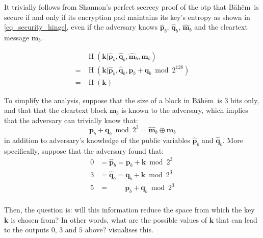\documentclass[twocolumn,hidelinks]{article}
\newcommand{\baheem}{Băhēm}
\DeclareMathOperator{\entropy}{H}
\begin{document}
It trivially follows from Shannon's perfect secrecy proof of the \gls{otp}
\cite{perfect_secrecy} that \baheem\ is secure if and only if its
encryption pad maintains its key's entropy as shown in
\cref{eq_security_hinge}, even if the adversary knows $\mathbf{\hat p}_b$,
$\mathbf{\hat q}_b$, $\mathbf{\hat m}_b$ and the cleartext message
$\mathbf{m}_b$.

\begin{equation}
    \begin{split}
        &\entropy(
            \mathbf{k}
            | \mathbf{\hat p}_b,
              \mathbf{\hat q}_b,
              \mathbf{\hat m}_b,
              \mathbf{m}_b
        ) \\
        =&\entropy(
            \mathbf{k}
            | \mathbf{\hat p}_b,
              \mathbf{\hat q}_b,
              \mathbf{p}_b + \mathbf{q}_b \bmod{2^{128}}
        ) \\
        =&\entropy(\mathbf{k})
    \end{split}
    \label{eq_security_hinge}
\end{equation}

To simplify the analysis, suppose that the size of a block in \baheem\ is
$3$ bits only, and that that the cleartext block $\mathbf{m}_b$ is known to
the adversary, which implies that the adversary can trivially know that:
\[
    \mathbf{p}_b + \mathbf{q}_b \bmod{2^3}
    = \mathbf{\hat m}_b \oplus \mathbf{m}_b
\]
in addition to adversary's knowledge of the public variables $\mathbf{\hat
p}_b$ and $\mathbf{\hat q}_b$. More specifically, suppose that the
adversary found that:
\begin{align*}
    0&=\mathbf{\hat p}_b = \mathbf{p}_b + \mathbf{k} \bmod{2^3}  \\
    3&=\mathbf{\hat q}_b = \mathbf{q}_b + \mathbf{k} \bmod{2^3}  \\
    5&=\qquad\             \mathbf{p}_b + \mathbf{q}_b \bmod{2^3}\\
\end{align*}

Then, the question is:  will this information reduce the space from which
the key $\mathbf{k}$ is chosen from?  In other words, what are the possible
values of $\mathbf{k}$ that can lead to the outputs $0$, $3$ and $5$ above?
 visualises this.
\end{document}
